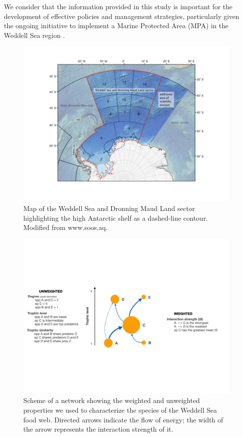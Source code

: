 \documentclass[gc, manuscript]{copernicus}
\begin{document}
We consider that the information provided in this study is important for
the development of effective policies and management strategies,
particularly given the ongoing initiative to implement a Marine
Protected Area (MPA) in the Weddell Sea region \citep{Teschke2021}.

\clearpage

\begin{figure}
\includegraphics[width=12cm]{Fig.1_StudyMap} \caption{Map of the Weddell Sea and Dronning Maud Land sector highlighting the high Antarctic shelf as a dashed-line contour. Modified from www.soos.aq.}\label{fig:unnamed-chunk-1}
\end{figure}

\clearpage

\begin{figure}
\includegraphics[width=12cm]{Fig.2_ToyFoodWeb} \caption{Scheme of a network showing the weighted and unweighted properties we used to characterize the species of the Weddell Sea food web. Directed arrows indicate the flow of energy; the width of the arrow represents the interaction strength of it.}\label{fig:unnamed-chunk-2}
\end{figure}
\end{document}
